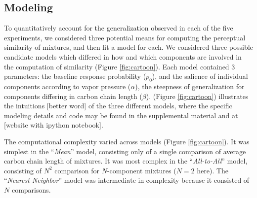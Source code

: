 \subsection*{Modeling}
\label{sec:results_modeling}
To quantitatively account for the generalization observed in each of the five experiments, we considered three potential means for computing the perceptual similarity of mixtures, and then fit a model for each.  
We considered three possible candidate models which differed in how and which components are involved in the computation of similarity (Figure \ref{fig:cartoon}).  
Each model contained 3 parameters: the baseline response probability ($p_0$), and the salience of individual components according to vapor pressure ($\alpha$), the steepness of generalization for components differing in carbon chain length ($\beta$).  (Figure \ref{fig:cartoon}) illustrates the intuitions [better word] of the three different models, where the specific modeling details and code may be found in the supplemental material and at [website with ipython notebook]. 

The computational complexity varied across models (Figure \ref{fig:cartoon}).  It was simplest in the ``\textit{Mean}'' model, consisting only of a single comparison of average carbon chain length of mixtures.  
It was most complex in the ``\textit{All-to-All}'' model, consisting of $N^2$ comparison for $N$-component mixtures ($N=2$ here).  The ``\textit{Nearest-Neighbor}'' model was intermediate in complexity because it consisted of $N$ comparisons.  